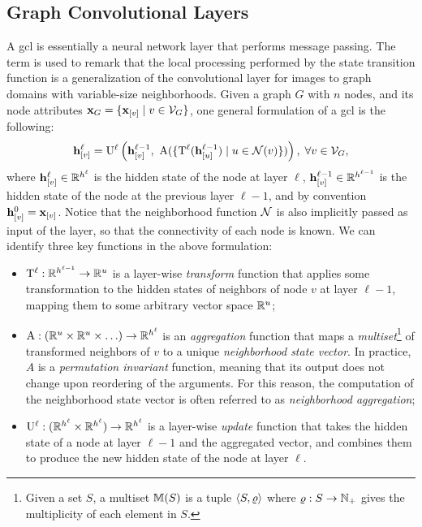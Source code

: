 \subsection{Graph Convolutional Layers} 
A \gls{gcl} is essentially a neural network layer that performs message passing. The term  is used to remark that the local processing performed by the state transition function is a generalization of the convolutional layer for images to graph domains with variable-size neighborhoods. Given a graph $G$ with $n$ nodes, and its node attributes $\Vector{X}_G = \Set{\Elem{x}{v} \mid v \in \Cal{V}_G}$, one general formulation of a \gls{gcl} is the following:
\begin{align*}
\Elem{h}{v}^{\ell} = \Fun{U}^{\ell} \Paren{\Elem{h}{v}^{\ell-1},\ \Fun{A}(\Set{\Fun{T}^{\ell}(\Elem{h}{u}^{\ell-1}) \mid u \in \mathcal{N}(v)} )}, \; \forall v \in \Cal{V}_G,
\label{eq:simple-aggregation}
\end{align*}
where $\Elem{h}{v}^{\ell} \in \Real^{h^\ell}$ is the hidden state of the node at layer $\ell$, $\Elem{h}{v}^{\ell-1} \in \Real^{h^{\ell-1}}$ is the hidden state of the node at the previous layer $\ell-1$, and by convention $\Elem{h}{v}^{0} = \Elem{x}{v}$. Notice that the neighborhood function $\Cal{N}$ is also implicitly passed as input of the layer, so that the connectivity of each node is known. We can identify three key functions in the above formulation:
\begin{itemize}
    \item $\mathrm{T}^\ell: \mathbb{R}^{h^{\ell-1}} \rightarrow \mathbb{R}^u$ is a layer-wise \emph{transform} function that applies some transformation to the hidden states of neighbors of node $v$ at layer $\ell-1$, mapping them to some arbitrary vector space $\mathbb{R}^u$;
    \item $\mathrm{A}: (\mathbb{R}^u \times \mathbb{R}^u \times \ldots) \rightarrow \mathbb{R}^{h^{\ell}}$ is an \emph{aggregation} function that maps a \emph{multiset}\footnote{Given a set $S$, a multiset $\mathbb{M}(S)$ is a tuple $\langle S, \varrho \rangle$ where $\varrho: S \rightarrow \mathbb{N}_+$ gives the multiplicity of each element in $S$.} of transformed neighbors of $v$ to a unique \emph{neighborhood state vector}. In practice, $A$ is a \emph{permutation invariant} function, meaning that its output does not change upon reordering of the arguments. For this reason, the computation of the neighborhood state vector is often referred to as \emph{neighborhood aggregation};
    \item $\mathrm{U}^\ell: (\mathbb{R}^{h^{\ell}} \times \mathbb{R}^{h^{\ell}}) \rightarrow \mathbb{R}^{h^{\ell}}$ is a layer-wise \emph{update} function that takes the hidden state of a node at layer $\ell-1$ and the aggregated vector, and combines them to produce the new hidden state of the node at layer $\ell$.
\end{itemize}
